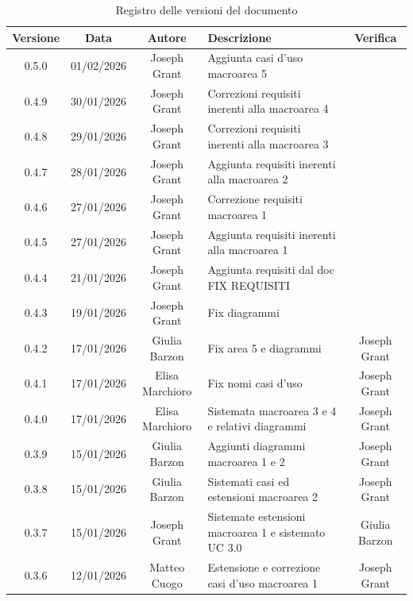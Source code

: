 \documentclass[11pt,a4paper]{article}
\begin{document}
\begin{longtable}[H]{|c|c|c|>{\raggedright\arraybackslash}p{}|c|}
    \caption{Registro delle versioni del documento}
    \label{tab:versionamento} \\
        \hline
        \textbf{Versione} & \textbf{Data} & \textbf{Autore} & \textbf{Descrizione} & \textbf{Verifica} \\
        \hline
        0.5.0 & 01/02/2026 & Joseph Grant & Aggiunta casi d'uso macroarea 5 &  \\
        \hline
        0.4.9 & 30/01/2026 & Joseph Grant & Correzioni requisiti inerenti alla macroarea 4 &  \\
        \hline
        0.4.8 & 29/01/2026 & Joseph Grant & Correzioni requisiti inerenti alla macroarea 3 &  \\
        \hline
        0.4.7 & 28/01/2026 & Joseph Grant & Aggiunta requisiti inerenti alla macroarea 2 &  \\
        \hline
        0.4.6 & 27/01/2026 & Joseph Grant & Correzione requisiti macroarea 1 &  \\
        \hline
        0.4.5 & 27/01/2026 & Joseph Grant & Aggiunta requisiti inerenti alla macroarea 1 &  \\
        \hline
        0.4.4 & 21/01/2026 & Joseph Grant & Aggiunta requisiti dal doc FIX REQUISITI &  \\
        \hline
        0.4.3 & 19/01/2026 & Joseph Grant & Fix diagrammi &  \\
        \hline
        0.4.2 & 17/01/2026 & Giulia Barzon & Fix area 5 e diagrammi & Joseph Grant \\
        \hline
        0.4.1 & 17/01/2026 & Elisa Marchioro & Fix nomi casi d'uso & Joseph Grant \\
        \hline
        0.4.0 & 17/01/2026 & Elisa Marchioro & Sistemata macroarea 3 e 4 e relativi diagrammi & Joseph Grant \\
        \hline
        0.3.9 & 15/01/2026 & Giulia Barzon & Aggiunti diagrammi macroarea 1 e 2 & Joseph Grant \\
        \hline
        0.3.8 & 15/01/2026 & Giulia Barzon & Sistemati casi ed estensioni macroarea 2 & Joseph Grant \\
        \hline
        0.3.7 & 15/01/2026 & Joseph Grant & Sistemate estensioni macroarea 1 e sistemato UC 3.0 & Giulia Barzon\\
        \hline
        0.3.6 & 12/01/2026 & Matteo Cuogo & Estensione e correzione casi d'uso macroarea 1 & Joseph Grant\\

\end{longtable}
\end{document}
